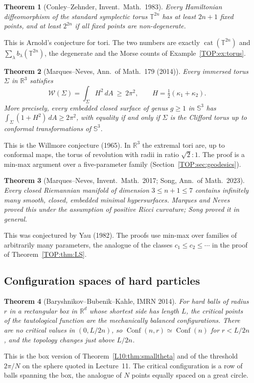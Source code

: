\documentclass[11pt,openany]{book}
\theoremstyle{plain}
\newtheorem{theorem}{Theorem}[chapter]
\theoremstyle{definition}
\theoremstyle{remark}
\newcommand{\R}{\mathbb{R}}
\newcommand{\T}{\mathbb{T}}
\newcommand{\Sph}{\mathbb{S}}          %
\newcommand{\Conf}{\operatorname{Conf}}
\begin{document}
\begin{theorem}[Conley--Zehnder, Invent.\ Math.\ 1983]
Every Hamiltonian diffeomorphism of the standard symplectic torus $\T^{2n}$ has at least $2n+1$ fixed points,
and at least $2^{2n}$ if all fixed points are non-degenerate.
\end{theorem}
\noindent This is Arnold's conjecture for tori. The two numbers are exactly
$\operatorname{cat}(\T^{2n})$ and $\sum_\lambda b_\lambda(\T^{2n})$, the degenerate and the Morse counts of
Example~\ref{TOP:ex:torus}.

\begin{theorem}[Marques--Neves, Ann.\ of Math.\ 179 (2014)]\label{TOP:thm:willmore}
Every immersed torus $\Sigma$ in $\R^3$ satisfies
\[
  \mathcal W(\Sigma)=\int_\Sigma H^2\,dA\ \ge\ 2\pi^2,\qquad H=\tfrac12(\kappa_1+\kappa_2).
\]
More precisely, every embedded closed surface of genus $g\ge1$ in $\Sph^3$ has
$\int_\Sigma(1+H^2)\,dA\ge2\pi^2$, with equality if and only if $\Sigma$ is the Clifford torus up to
conformal transformations of $\Sph^3$.
\end{theorem}
\noindent This is the Willmore conjecture (1965). In $\R^3$ the extremal tori are, up to conformal
maps, the torus of revolution with radii in ratio $\sqrt2:1$. The proof is a min-max argument over a
five-parameter family (Section~\ref{TOP:sec:geodesics}).

\begin{theorem}[Marques--Neves, Invent.\ Math.\ 2017; Song, Ann.\ of Math.\ 2023]\label{TOP:thm:yau}
Every closed Riemannian manifold of dimension $3\le n+1\le7$ contains infinitely many smooth, closed,
embedded minimal hypersurfaces. Marques and Neves proved this under the assumption of positive Ricci curvature;
Song proved it in general.
\end{theorem}
\noindent This was conjectured by Yau (1982). The proofs use min-max over families of arbitrarily many
parameters, the analogue of the classes $c_1\le c_2\le\cdots$ in the proof of Theorem~\ref{TOP:thm:LS}.

\subsection*{Configuration spaces of hard particles}

\begin{theorem}[Baryshnikov--Bubenik--Kahle, IMRN 2014]\label{TOP:thm:BBK}
For hard balls of radius $r$ in a rectangular box in $\R^d$ whose shortest side has length $L$, the
critical points of the tautological function are the mechanically balanced configurations. There are no
critical values in $(0,L/2n)$, so $\Conf(n,r)\simeq\Conf(n)$ for $r<L/2n$, and the topology changes just above
$L/2n$.
\end{theorem}
\noindent This is the box version of Theorem~\ref{L10:thm:smalltheta} and of the threshold $2\pi/N$ on the sphere
quoted in Lecture~11. The critical configuration is a row of balls spanning the box, the analogue of
$N$ points equally spaced on a great circle.
\end{document}
